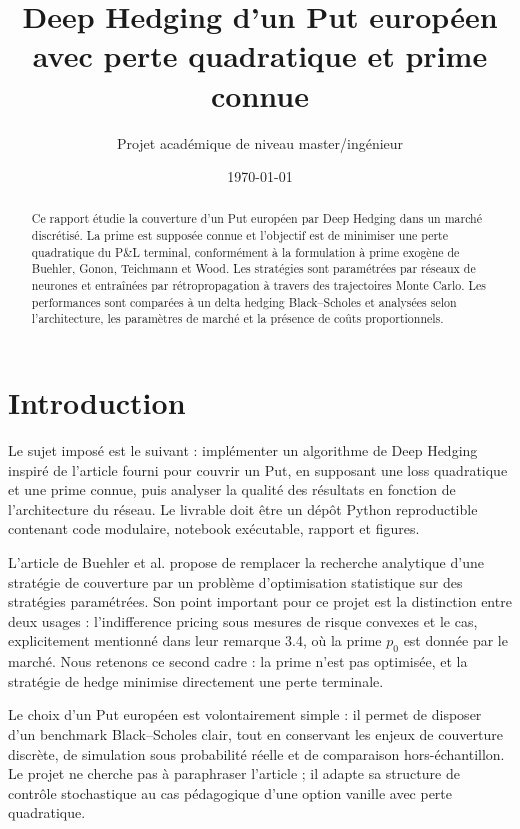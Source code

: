 \documentclass[11pt,a4paper]{article}
\title{Deep Hedging d'un Put européen avec perte quadratique et prime connue}
\author{Projet académique de niveau master/ingénieur}
\date{\today}
\begin{document}
\maketitle

\begin{abstract}
Ce rapport étudie la couverture d'un Put européen par Deep Hedging dans un
marché discrétisé. La prime est supposée connue et l'objectif est de minimiser
une perte quadratique du P\&L terminal, conformément à la formulation à prime
exogène de Buehler, Gonon, Teichmann et Wood. Les stratégies sont paramétrées
par réseaux de neurones et entraînées par rétropropagation à travers des
trajectoires Monte Carlo. Les performances sont comparées à un delta hedging
Black--Scholes et analysées selon l'architecture, les paramètres de marché et
la présence de coûts proportionnels.
\end{abstract}

\section{Introduction}

Le sujet imposé est le suivant : implémenter un algorithme de Deep Hedging
inspiré de l'article fourni pour couvrir un Put, en supposant une loss
quadratique et une prime connue, puis analyser la qualité des résultats en
fonction de l'architecture du réseau. Le livrable doit être un dépôt Python
reproductible contenant code modulaire, notebook exécutable, rapport et
figures.

L'article de Buehler et al. propose de remplacer la recherche analytique d'une
stratégie de couverture par un problème d'optimisation statistique sur des
stratégies paramétrées. Son point important pour ce projet est la distinction
entre deux usages : l'indifference pricing sous mesures de risque convexes et
le cas, explicitement mentionné dans leur remarque 3.4, où la prime $p_0$ est
donnée par le marché. Nous retenons ce second cadre : la prime n'est pas
optimisée, et la stratégie de hedge minimise directement une perte terminale.

Le choix d'un Put européen est volontairement simple : il permet de disposer
d'un benchmark Black--Scholes clair, tout en conservant les enjeux de couverture
discrète, de simulation sous probabilité réelle et de comparaison
hors-échantillon. Le projet ne cherche pas à paraphraser l'article ; il adapte
sa structure de contrôle stochastique au cas pédagogique d'une option vanille
avec perte quadratique.
\end{document}
